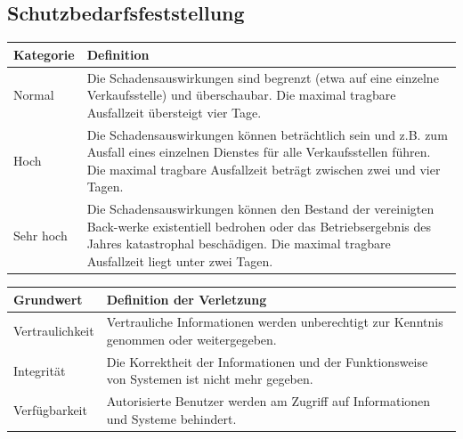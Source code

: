 \subsection{Schutzbedarfsfeststellung}
\label{subsec:schutzbedarfsfeststellung}
\begin{minipage}{\textwidth}
\begin{center}
\begin{tabular}{lp{14cm}}
\toprule
Kategorie & Definition \\
\midrule
Normal & Die Schadensauswirkungen sind begrenzt (etwa auf eine einzelne Verkaufsstelle) und überschaubar. \newline Die maximal tragbare Ausfallzeit übersteigt vier Tage.\\[0.3cm]
Hoch & Die Schadensauswirkungen können beträchtlich sein und z.B. zum Ausfall eines einzelnen Dienstes für alle Verkaufsstellen führen. \newline Die maximal tragbare Ausfallzeit beträgt zwischen zwei und vier Tagen. \\[0.3cm]
Sehr hoch & Die Schadensauswirkungen können den Bestand der vereinigten Back-werke existentiell bedrohen oder das Betriebsergebnis des Jahres katastrophal beschädigen. \newline Die maximal tragbare Ausfallzeit liegt unter zwei Tagen. \\
\bottomrule
\end{tabular}
\end{center}
\end{minipage}
\bigskip

\begin{minipage}{\textwidth}
\begin{center}
\begin{tabular}{lp{14cm}}
\toprule
Grundwert & Definition der Verletzung \\
\midrule
Vertraulichkeit & Vertrauliche Informationen werden unberechtigt zur Kenntnis genommen oder weitergegeben. \\
Integrität & Die Korrektheit der Informationen und der Funktionsweise von Systemen ist nicht mehr gegeben. \\
Verfügbarkeit & Autorisierte Benutzer werden am Zugriff auf Informationen und Systeme behindert. \\
\bottomrule
\end{tabular}
\end{center}
\end{minipage}

